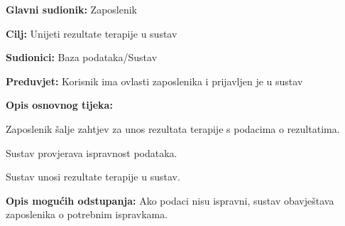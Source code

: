                 \noindent {}
					\begin{packed_item}
	
						\item \textbf{Glavni sudionik: }Zaposlenik
						\item  \textbf{Cilj:} Unijeti rezultate terapije u sustav
						\item  \textbf{Sudionici:} Baza podataka/Sustav
						\item  \textbf{Preduvjet:} Korisnik ima ovlasti zaposlenika i prijavljen je u sustav
						\item  \textbf{Opis osnovnog tijeka:}
						
						\item[] \begin{packed_enum}
	
							\item Zaposlenik šalje zahtjev za unos rezultata terapije s podacima o rezultatima.
							\item Sustav provjerava ispravnost podataka.
                            \item Sustav unosi rezultate terapije u sustav.
	
						\end{packed_enum}
						
						\item  \textbf{Opis mogućih odstupanja:} Ako podaci nisu ispravni, sustav obavještava zaposlenika o potrebnim ispravkama.
						
						
					\end{packed_item}

